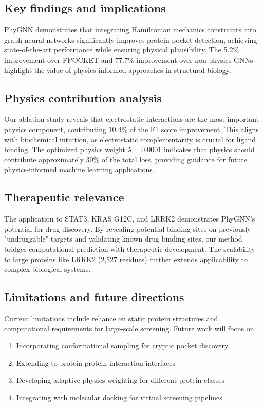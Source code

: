 \subsection*{Key findings and implications}
PhyGNN demonstrates that integrating Hamiltonian mechanics constraints into graph neural networks significantly improves protein pocket detection, achieving state-of-the-art performance while ensuring physical plausibility. The 5.2\% improvement over FPOCKET and 77.7\% improvement over non-physics GNNs highlight the value of physics-informed approaches in structural biology.

\subsection*{Physics contribution analysis}
Our ablation study reveals that electrostatic interactions are the most important physics component, contributing 10.4\% of the F1 score improvement. This aligns with biochemical intuition, as electrostatic complementarity is crucial for ligand binding. The optimized physics weight $\lambda = 0.0001$ indicates that physics should contribute approximately 30\% of the total loss, providing guidance for future physics-informed machine learning applications.

\subsection*{Therapeutic relevance}
The application to STAT3, KRAS G12C, and LRRK2 demonstrates PhyGNN's potential for drug discovery. By revealing potential binding sites on previously "undruggable" targets and validating known drug binding sites, our method bridges computational prediction with therapeutic development. The scalability to large proteins like LRRK2 (2,527 residues) further extends applicability to complex biological systems.

\subsection*{Limitations and future directions}
Current limitations include reliance on static protein structures and computational requirements for large-scale screening. Future work will focus on:
\begin{enumerate}
    \item Incorporating conformational sampling for cryptic pocket discovery
    \item Extending to protein-protein interaction interfaces
    \item Developing adaptive physics weighting for different protein classes
    \item Integrating with molecular docking for virtual screening pipelines
\end{enumerate}

